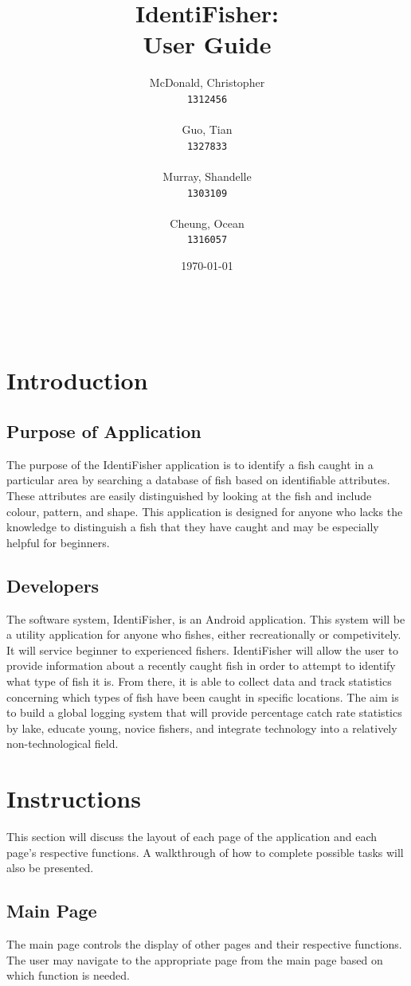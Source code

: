 \documentclass{article}
\title{IdentiFisher: \\ User Guide \\}
\author{
\Large McDonald, Christopher\\
\texttt{1312456} \\ \\
\Large Guo, Tian\\
\texttt{1327833} \\ \\
\Large Murray, Shandelle\\
\texttt{1303109} \\ \\
\Large Cheung, Ocean\\
\texttt{1316057} \\
}
\date{\today}
\begin{document}
\maketitle

\newpage
\tableofcontents
\vfill
\noindent \\


\pagebreak
\section{Introduction}

\subsection{Purpose of Application}
The purpose of the IdentiFisher application is to identify a fish caught in a particular area
by searching a database of fish based on identifiable attributes. These attributes are easily distinguished by looking at the fish and include
colour, pattern, and shape. This application is designed for anyone who lacks the knowledge to distinguish a fish that they have caught and may be especially helpful for beginners.

\subsection{Developers}
The software system, IdentiFisher, is an Android application.
This system will be a utility application for anyone who fishes, either recreationally or
competivitely. It will service beginner to experienced fishers. IdentiFisher will allow
the user to provide information about a recently caught fish in order to attempt to identify what type
of fish it is. From there, it is able to collect data and track statistics concerning which types of fish have been caught in specific locations. The aim is to
build a global logging system that will provide percentage catch rate statistics by lake,
educate young, novice fishers, and integrate technology into a relatively non-technological field.


\section{Instructions}
This section will discuss the layout of each page of the application and each page's respective functions.
A walkthrough of how to complete possible tasks will also be presented.

\subsection{Main Page}
The main page controls the display of other pages and their respective functions. The user may navigate to the
appropriate page from the main page based on which function is needed. \\
\end{document}

